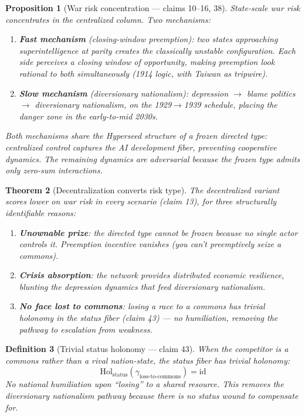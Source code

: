 \documentclass[11pt,a4paper]{article}
\newtheorem{definition}{Definition}[section]
\newtheorem{theorem}[definition]{Theorem}
\newtheorem{proposition}[definition]{Proposition}
\begin{document}
\begin{proposition}[War risk concentration --- claims 10--16, 38]
\label{prop:war}
State-scale war risk concentrates in the centralized column. Two
mechanisms:
\begin{enumerate}
\item \textbf{Fast mechanism} (closing-window preemption): two states
  approaching superintelligence at parity creates the classically
  unstable configuration. Each side perceives a closing window of
  opportunity, making preemption look rational to both simultaneously
  (1914 logic, with Taiwan as tripwire).
\item \textbf{Slow mechanism} (diversionary nationalism): depression
  $\to$ blame politics $\to$ diversionary nationalism, on the
  1929$\to$1939 schedule, placing the danger zone in the early-to-mid
  2030s.
\end{enumerate}
Both mechanisms share the Hyperseed structure of a \emph{frozen directed
type}: centralized control captures the AI development fiber, preventing
cooperative dynamics. The remaining dynamics are adversarial because the
frozen type admits only zero-sum interactions.
\end{proposition}

\begin{theorem}[Decentralization converts risk type]
\label{thm:convert}
The decentralized variant scores lower on war risk in every scenario
(claim 13), for three structurally identifiable reasons:
\begin{enumerate}
\item \textbf{Unownable prize}: the directed type cannot be frozen
  because no single actor controls it. Preemption incentive vanishes
  (you can't preemptively seize a commons).
\item \textbf{Crisis absorption}: the network provides distributed
  economic resilience, blunting the depression dynamics that feed
  diversionary nationalism.
\item \textbf{No face lost to commons}: losing a race to a commons
  has trivial holonomy in the status fiber (claim 43) --- no
  humiliation, removing the pathway to escalation from weakness.
\end{enumerate}
\end{theorem}

\begin{definition}[Trivial status holonomy --- claim 43]
\label{def:face}
When the competitor is a commons rather than a rival nation-state,
the status fiber has trivial holonomy:
\[
  \text{Hol}_{\text{status}}(\gamma_{\text{loss-to-commons}}) = \text{id}
\]
No national humiliation upon ``losing'' to a shared resource. This
removes the diversionary nationalism pathway because there is no
status wound to compensate for.
\end{definition}
\end{document}
